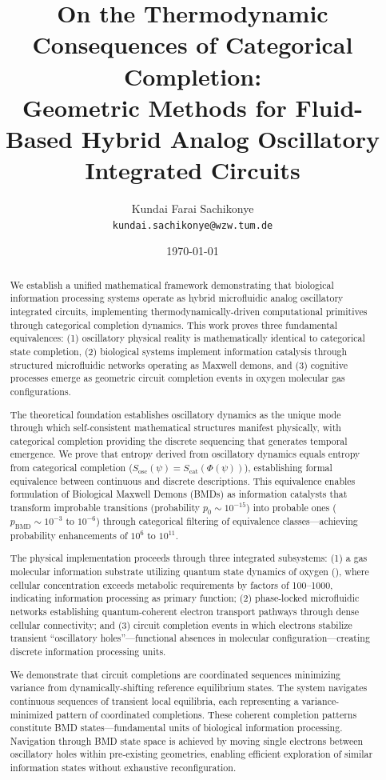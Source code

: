 \documentclass[11pt,a4paper]{article}
\title{On the Thermodynamic Consequences of Categorical Completion:\\
       Geometric Methods for Fluid-Based Hybrid Analog Oscillatory Integrated Circuits}
\author{
Kundai Farai Sachikonye \\
\texttt{kundai.sachikonye@wzw.tum.de}
}
\date{\today}
\begin{document}
\maketitle

\begin{abstract}
We establish a unified mathematical framework demonstrating that biological information processing systems operate as hybrid microfluidic analog oscillatory integrated circuits, implementing thermodynamically-driven computational primitives through categorical completion dynamics. This work proves three fundamental equivalences: (1) oscillatory physical reality is mathematically identical to categorical state completion, (2) biological systems implement information catalysis through structured microfluidic networks operating as Maxwell demons, and (3) cognitive processes emerge as geometric circuit completion events in oxygen molecular gas configurations.

The theoretical foundation establishes oscillatory dynamics as the unique mode through which self-consistent mathematical structures manifest physically, with categorical completion providing the discrete sequencing that generates temporal emergence. We prove that entropy derived from oscillatory dynamics equals entropy from categorical completion ($S_{\text{osc}}(\psi) = S_{\text{cat}}(\Phi(\psi))$), establishing formal equivalence between continuous and discrete descriptions. This equivalence enables formulation of Biological Maxwell Demons (BMDs) as information catalysts that transform improbable transitions (probability $p_0 \sim 10^{-15}$) into probable ones ($p_{\text{BMD}} \sim 10^{-3}$ to $10^{-6}$) through categorical filtering of equivalence classes—achieving probability enhancements of $10^6$ to $10^{11}$.

The physical implementation proceeds through three integrated subsystems: (1) a gas molecular information substrate utilizing quantum state dynamics of oxygen (), where cellular  concentration exceeds metabolic requirements by factors of 100--1000, indicating information processing as primary function; (2) phase-locked microfluidic networks establishing quantum-coherent electron transport pathways through dense cellular connectivity; and (3) circuit completion events in which electrons stabilize transient ``oscillatory holes''—functional absences in  molecular configuration—creating discrete information processing units.

We demonstrate that circuit completions are coordinated sequences minimizing variance from dynamically-shifting reference equilibrium states. The system navigates continuous sequences of transient local equilibria, each representing a variance-minimized pattern of coordinated completions. These coherent completion patterns constitute BMD states—fundamental units of biological information processing. Navigation through BMD state space is achieved by moving single electrons between oscillatory holes within pre-existing  geometries, enabling efficient exploration of similar information states without exhaustive reconfiguration.


\end{abstract}
\end{document}
